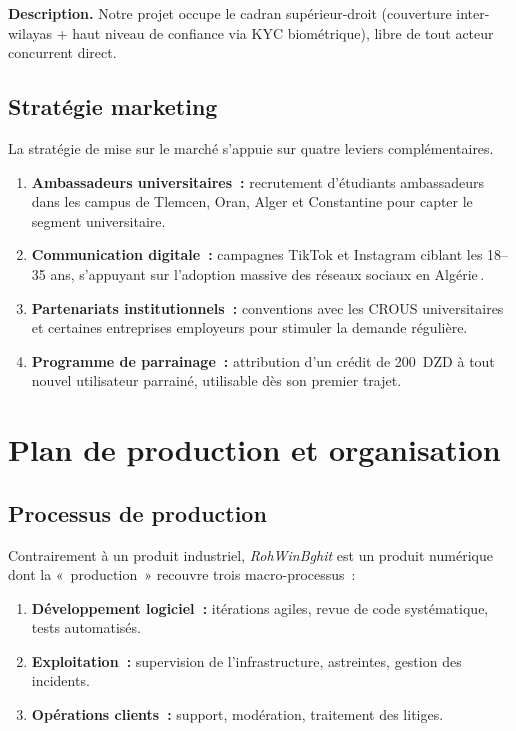 \textbf{Description.} Notre projet occupe le cadran supérieur-droit (couverture inter-wilayas + haut niveau de confiance via KYC biométrique), libre de tout acteur concurrent direct.

\subsection{Stratégie marketing}

La stratégie de mise sur le marché s'appuie sur quatre leviers complémentaires.
\begin{enumerate}
  \item \textbf{Ambassadeurs universitaires~:} recrutement d'étudiants ambassadeurs dans les campus de Tlemcen, Oran, Alger et Constantine pour capter le segment universitaire.
  \item \textbf{Communication digitale~:} campagnes TikTok et Instagram ciblant les 18--35 ans, s'appuyant sur l'adoption massive des réseaux sociaux en Algérie\,\cite{DataReportal2025}.
  \item \textbf{Partenariats institutionnels~:} conventions avec les CROUS universitaires et certaines entreprises employeurs pour stimuler la demande régulière.
  \item \textbf{Programme de parrainage~:} attribution d'un crédit de 200~DZD à tout nouvel utilisateur parrainé, utilisable dès son premier trajet.
\end{enumerate}

\section{Plan de production et organisation}

\subsection{Processus de production}

Contrairement à un produit industriel, \textit{RohWinBghit} est un produit numérique dont la «~production~» recouvre trois macro-processus~:
\begin{enumerate}
  \item \textbf{Développement logiciel~:} itérations agiles, revue de code systématique, tests automatisés.
  \item \textbf{Exploitation~:} supervision de l'infrastructure, astreintes, gestion des incidents.
  \item \textbf{Opérations clients~:} support, modération, traitement des litiges.
\end{enumerate}

